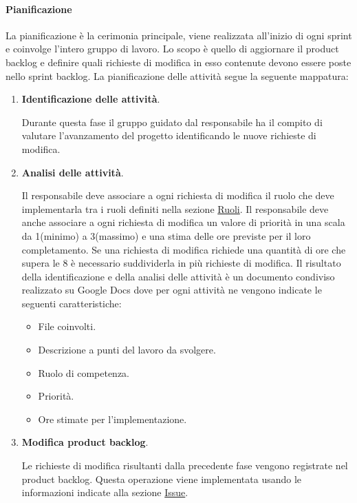 \paragraph{Pianificazione}
La pianificazione è la cerimonia principale, viene realizzata all’inizio di ogni sprint e coinvolge l'intero gruppo di lavoro.
Lo scopo è quello di aggiornare il product backlog e definire quali richieste di modifica in esso contenute devono essere poste nello sprint backlog.
La pianificazione delle attività segue la seguente mappatura:
\begin{enumerate}
    \item \textbf{Identificazione delle attività}.
    
    Durante questa fase il gruppo guidato dal responsabile ha il compito di valutare l’avanzamento del progetto identificando le nuove richieste di modifica.

    \item \textbf{Analisi delle attività}.
    
    Il responsabile deve associare a ogni richiesta di modifica il ruolo che deve implementarla tra i ruoli definiti nella sezione \hyperref[subsubsec:ruoli]{Ruoli}.
    Il responsabile deve anche associare a ogni richiesta di modifica un valore di priorità in una scala da 1(minimo) a 3(massimo) e una stima delle ore previste per il loro completamento.
    Se una richiesta di modifica richiede una quantità di ore che supera le 8 è necessario suddividerla in più richieste di modifica.
    Il risultato della identificazione e della analisi delle attività è un documento condiviso realizzato su Google Docs dove per ogni attività ne vengono indicate le seguenti caratteristiche:
    \begin{itemize}
        \item File coinvolti.
        \item Descrizione a punti del lavoro da svolgere.
        \item Ruolo di competenza.
        \item Priorità.
        \item Ore stimate per l'implementazione.
    \end{itemize}

    \item \textbf{Modifica product backlog}.
    
    Le richieste di modifica risultanti dalla precedente fase vengono registrate nel product backlog.
    Questa operazione viene implementata usando le informazioni indicate alla sezione \hyperref[subpar:ITS]{Issue}.


\end{enumerate}
